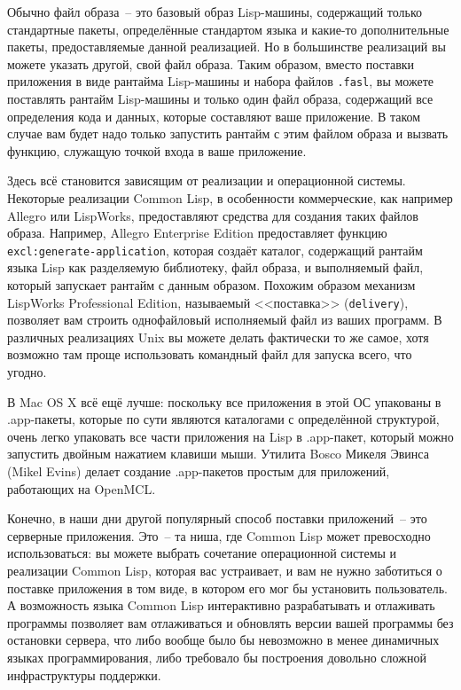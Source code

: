 Обычно файл образа~-- это базовый образ Lisp-машины, содержащий только стандартные пакеты,
определённые стандартом языка и какие-то дополнительные пакеты, предоставляемые данной
реализацией. Но в большинстве реализаций вы можете указать другой, свой файл образа. Таким
образом, вместо поставки приложения в виде рантайма Lisp-машины и набора файлов
\lstinline{.fasl}, вы можете поставлять рантайм Lisp-машины и только один файл образа,
содержащий все определения кода и данных, которые составляют ваше приложение. В таком
случае вам будет надо только запустить рантайм с этим файлом образа и вызвать функцию,
служащую точкой входа в ваше приложение.

Здесь всё становится зависящим от реализации и операционной системы. Некоторые реализации
Common Lisp, в особенности коммерческие, как например Allegro или LispWorks, предоставляют
средства для создания таких файлов образа. Например, Allegro Enterprise Edition
предоставляет функцию \lstinline{excl:generate-application}, которая создаёт каталог,
содержащий рантайм языка Lisp как разделяемую библиотеку, файл образа, и выполняемый файл,
который запускает рантайм с данным образом. Похожим образом механизм LispWorks
Professional Edition, называемый <<поставка>> (\lstinline{delivery}), позволяет вам строить
однофайловый исполняемый файл из ваших программ. В различных реализациях Unix вы можете
делать фактически то же самое, хотя возможно там проще использовать командный файл для
запуска всего, что угодно.

В Mac OS X всё ещё лучше: поскольку все приложения в этой ОС упакованы в .app-пакеты,
которые по сути являются каталогами с определённой структурой, очень легко упаковать все
части приложения на Lisp в .app-пакет, который можно запустить двойным нажатием клавиши
мыши. Утилита Bosco Микеля Эвинса (Mikel Evins) делает создание .app-пакетов простым для
приложений, работающих на OpenMCL.

Конечно, в наши дни другой популярный способ поставки приложений~-- это серверные
приложения. Это~-- та ниша, где Common Lisp может превосходно использоваться: вы можете
выбрать сочетание операционной системы и реализации Common Lisp, которая вас устраивает, и
вам не нужно заботиться о поставке приложения в том виде, в котором его мог бы установить
пользователь. А возможность языка Common Lisp интерактивно разрабатывать и отлаживать
программы позволяет вам отлаживаться и обновлять версии вашей программы без остановки
сервера, что либо вообще было бы невозможно в менее динамичных языках программирования,
либо требовало бы построения довольно сложной инфраструктуры поддержки.

